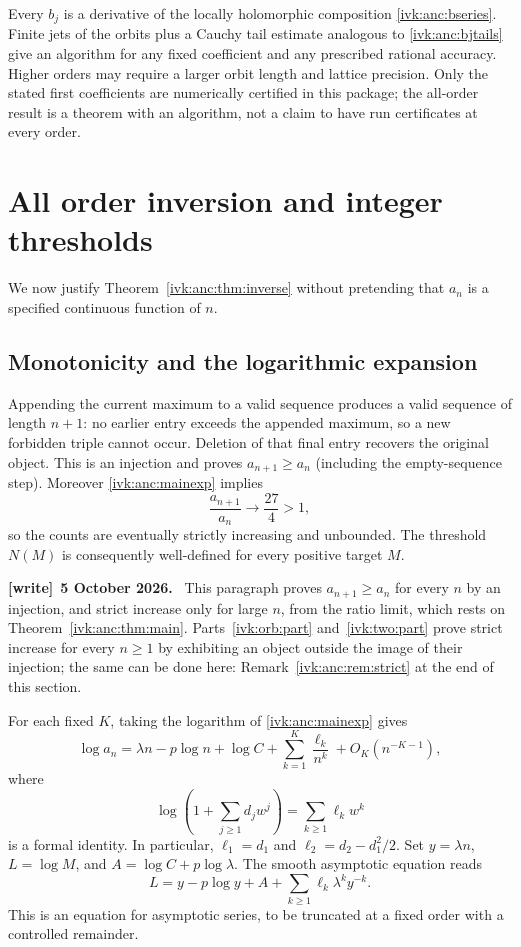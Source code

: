 \documentclass[11pt,letterpaper]{article}
\theoremstyle{remark}\newtheorem{remark}[theorem]{Remark}
\newenvironment{writenote}[1][]{\par\smallskip\begingroup\small
 \noindent\textbf{[write]}\if\relax\detokenize{#1}\relax\else~\textbf{#1.}\fi\ }%
 {\par\endgroup\smallskip}
\begin{document}
Every $b_j$ is a derivative of the locally holomorphic composition
\eqref{ivk:anc:bseries}. Finite jets of the orbits plus a Cauchy tail
estimate analogous to \eqref{ivk:anc:bjtails} give an algorithm for any
fixed coefficient and any prescribed rational accuracy. Higher
orders may require a larger orbit length and lattice precision.
Only the stated first coefficients are numerically certified in
this package; the all-order result is a theorem with an algorithm,
not a claim to have run certificates at every order.

\section{All order inversion and integer thresholds}\label{ivk:anc:sec:inverse}
We now justify Theorem~\ref{ivk:anc:thm:inverse} without pretending that
$a_n$ is a specified continuous function of $n$.

\subsection{Monotonicity and the logarithmic expansion}
Appending the current maximum to a valid sequence produces a
valid sequence of length $n+1$: no earlier entry exceeds the
appended maximum, so a new forbidden triple cannot occur.
Deletion of that final entry recovers the original object.
This is an injection and proves $a_{n+1}\ge a_n$ (including the
empty-sequence step). Moreover \eqref{ivk:anc:mainexp} implies
\[
 \frac{a_{n+1}}{a_n}\longrightarrow\frac{27}{4}>1,
\]
so the counts are eventually strictly increasing and unbounded.
The threshold $N(M)$ is consequently well-defined for every
positive target $M$.
\begin{writenote}[5 October 2026]
This paragraph proves $a_{n+1}\ge a_n$ for every $n$ by an injection, and strict increase only for large $n$, from the ratio limit, which rests on Theorem~\ref{ivk:anc:thm:main}. Parts~\ref{ivk:orb:part} and~\ref{ivk:two:part} prove strict increase for every $n\ge1$ by exhibiting an object outside the image of their injection; the same can be done here: Remark~\ref{ivk:anc:rem:strict} at the end of this section.
\end{writenote}


For each fixed $K$, taking the logarithm of \eqref{ivk:anc:mainexp} gives
\begin{equation}\label{ivk:anc:logasym}
 \log a_n=\lambda n-p\log n+\log C
          +\sum_{k=1}^K\frac{\ell_k}{n^k}+O_K(n^{-K-1}),
\end{equation}
where
\begin{equation}\label{ivk:anc:ellcoeff}
 \log\left(1+\sum_{j\ge1}d_jw^j\right)
       =\sum_{k\ge1}\ell_kw^k
\end{equation}
is a formal identity. In particular,
$\ell_1=d_1$ and $\ell_2=d_2-d_1^2/2$.
Set $y=\lambda n$, $L=\log M$, and
$A=\log C+p\log\lambda$. The smooth asymptotic equation reads
\begin{equation}\label{ivk:anc:yequation}
 L=y-p\log y+A+
       \sum_{k\ge1}\ell_k\lambda^ky^{-k}.
\end{equation}
This is an equation for asymptotic series, to be truncated at a
fixed order with a controlled remainder.
\end{document}
